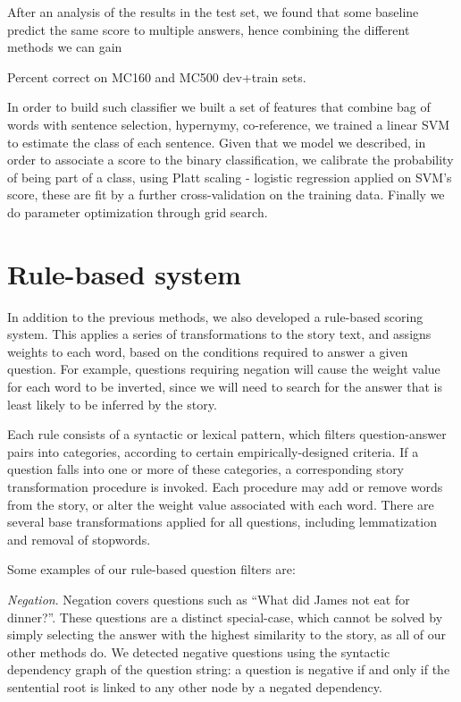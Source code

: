 \documentclass[11pt]{article}
\begin{document}
After an analysis of the results in the test set, we found that some baseline predict the same score to multiple answers, hence combining the different methods we can gain %

\begin{table}[!th]

\caption{\label{table:results}Percent correct on MC160 and MC500 dev+train sets.}
\end{table}


In order to build such classifier we built a set of features that combine bag of words with sentence selection, hypernymy, co-reference, we trained a linear SVM to estimate the class of each sentence. Given that we model we described, in order to associate a score to the binary classification, we calibrate the probability of being part of a class, using Platt scaling \cite{plath_scaling} - logistic regression applied on SVM's score, these are fit by a further cross-validation on the training data. Finally we do parameter optimization through grid search.

\section{Rule-based system}
\label{sec:rulebased}

In addition to the previous methods, we also developed a rule-based scoring system. This applies a series of transformations to the story text, and assigns weights to each word, based on the conditions required to answer a given question. For example, questions requiring negation will cause the weight value for each word to be inverted, since we will need to search for the answer that is least likely to be inferred by the story.

Each rule consists of a syntactic or lexical pattern, which filters question-answer pairs into categories, according to certain empirically-designed criteria. If a question falls into one or more of these categories, a corresponding story transformation procedure is invoked. Each procedure may add or remove words from the story, or alter the weight value associated with each word. There are several base transformations applied for all questions, including lemmatization and removal of stopwords.

Some examples of our rule-based question filters are:

\textit{Negation}. Negation covers questions such as ``What did James not eat for dinner?''. These questions are a distinct special-case, which cannot be solved by simply selecting the answer with the highest similarity to the story, as all of our other methods do. We detected negative questions using the syntactic dependency graph of the question string: a question is negative if and only if the sentential root is linked to any other node by a negated dependency.
\end{document}
